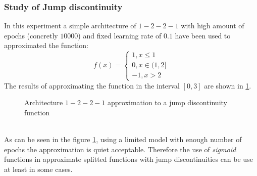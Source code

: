 \documentclass[a4paper, 11pt]{article}
\begin{document}
\subsubsection{Study of Jump discontinuity}
In this experiment a simple architecture of $1-2-2-1$ with high amount of epochs (concretly $10000$) and fixed learning rate of $0.1$ have been used to approximated the function:
$$ f(x) = \left\{ \begin{matrix}
    1, x \leq 1 \\
    0, x \in (1,2] \\
    -1, x > 2
\end{matrix} \right. $$
The results of approximating the function in the interval $[0,3]$ are shown in \ref{disc}.
\begin{figure}[h]
    \centering
    \caption{Architecture $1-2-2-1$ approximation to a jump discontinuity function}
    \label{disc}
\end{figure}\\
As can be seen in the figure \ref{disc}, using a limited model with enough number of epochs the approximation is quiet acceptable. Therefore the use of \textit{sigmoid} functions in approximate splitted functions with jump discontinuities can be use at least in some cases.
\end{document}
